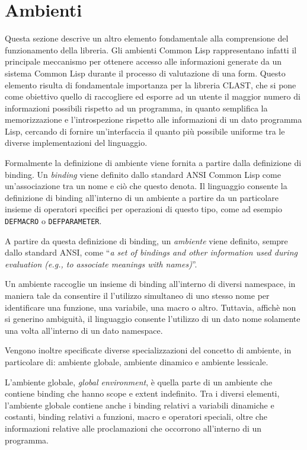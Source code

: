 \section{Ambienti}
\label{environments}

Questa sezione descrive un altro elemento fondamentale alla comprensione del
funzionamento della libreria. Gli ambienti Common Lisp rappresentano infatti il
principale meccanismo per ottenere accesso alle informazioni generate da un
sistema Common Lisp durante il processo di valutazione di una form. Questo
elemento risulta di fondamentale importanza per la libreria CLAST, che si pone
come obiettivo quello di raccogliere ed esporre ad un utente il maggior numero
di informazioni possibili rispetto ad un programma, in quanto semplifica la
memorizzazione e l'introspezione rispetto alle informazioni di un dato programma
Lisp, cercando di fornire un'interfaccia il quanto più possibile uniforme tra le
diverse implementazioni del linguaggio.

Formalmente la definizione di ambiente viene fornita a partire dalla definizione
di binding. Un \textit{binding} viene definito dallo standard ANSI Common Lisp
come un'associazione tra un nome e ciò che questo denota. Il linguaggio consente
la definizione di binding all'interno di un ambiente a partire da un particolare
insieme di operatori specifici per operazioni di questo tipo, come ad esempio
\texttt{DEFMACRO} o \texttt{DEFPARAMETER}.

A partire da questa definizione di binding, un \textit{ambiente} viene definito,
sempre dallo standard ANSI, come \enquote{\textit{a set of bindings and other
information used during evaluation (e.g., to associate meanings with names)}}.

Un ambiente raccoglie un insieme di binding all'interno di diversi namespace,
in maniera tale da consentire il l'utilizzo simultaneo di uno stesso nome per
identificare una funzione, una variabile, una macro o altro. Tuttavia, affichè
non si generino ambiguità, il linguaggio consente l'utilizzo di un dato nome
solamente una volta all'interno di un dato namespace.

Vengono inoltre specificate diverse specializzazioni del concetto di ambiente,
in particolare di: ambiente globale, ambiente dinamico e ambiente lessicale.

L'ambiente globale, \textit{global environment}, è quella parte di un ambiente
che contiene binding che hanno scope e extent indefinito. Tra i diversi
elementi, l'ambiente globale contiene anche i binding relativi a variabili
dinamiche e costanti, binding relativi a funzioni, macro e operatori speciali,
oltre che informazioni relative alle proclamazioni che occorrono all'interno di
un programma.

